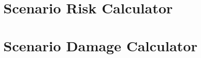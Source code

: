 \section{Scenario Risk Calculator}
   \label{sec:acc-sr}
   
\section{Scenario Damage Calculator}
   \label{sec:acc-sd}
%    
%    
%    
%    
